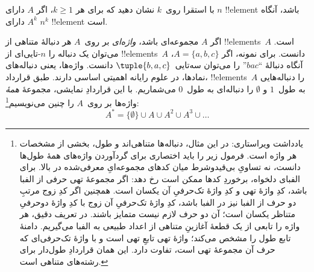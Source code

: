 \documentclass[../../../include/open-logic-section]{subfiles}
\begin{document}
\begin{prob}
با استقرا روی~$k$ نشان دهید که برای هر $k \ge 1$، اگر $A$ دارای
$n$ !!{element} باشد، آنگاه $A^k$ دارای $n^k$ !!{element} است.
\end{prob}

\begin{ex}
اگر $A$ مجموعه‌ای باشد، \emph{واژه‌ای} بر روی~$A$ هر دنبالهٔ متناهی از
!!{element}s~$A$ است. می‌توان یک دنباله را $n$-تایی‌ای از
!!{element}s~$A$ دانست. برای نمونه، اگر $A = \{a, b, c\}$، آنگاه
دنبالهٔ ``$bac$'' را می‌توان سه‌تایی~$\tuple{b, a, c}$ دانست.
واژه‌ها، یعنی دنباله‌های نمادها، در علوم رایانه اهمیتی اساسی دارند.
طبق قرارداد، !!{element}s~$A$ را دنباله‌هایی به طول~$1$ و
$\emptyset$ را دنباله‌ای به طول~$0$ می‌شماریم. با این قراردادِ نمایشی، مجموعهٔ
\emph{همهٔ} واژه‌ها بر روی~$A$ را چنین می‌نویسیم\footnote{یادداشت ویراستاری: در این مثال، دنباله‌ها متناهی‌اند و طول، بخشی از مشخصات هر واژه است. فرمول زیر را باید اختصاری برای گردآوردن واژه‌های همهٔ طول‌ها دانست، نه تساویِ بی‌قیدوشرط میان کدهای مجموعه‌ایِ معرفی‌شده در بالا. برای الفبای دلخواه، برخوردِ کدها ممکن است رخ دهد: اگر مجموعهٔ تهی حرفی از الفبا باشد، کدِ واژهٔ تهی و کدِ واژهٔ تک‌حرفیِ آن یکسان است. همچنین اگر کدِ زوج مرتبِ دو حرف از الفبا نیز در الفبا باشد، کدِ واژهٔ تک‌حرفیِ آن زوج با کدِ واژهٔ دوحرفیِ متناظر یکسان است؛ آن دو حرف لازم نیست متمایز باشند. در تعریف دقیق، هر واژه را تابعی از یک قطعهٔ آغازینِ متناهی از اعداد طبیعی به الفبا می‌گیریم. دامنهٔ تابع طول را مشخص می‌کند؛ واژهٔ تهی تابعِ تهی است و با واژهٔ تک‌حرفی‌ای که حرف آن مجموعهٔ تهی است، تفاوت دارد. این همان قراردادِ طول‌دار برای رشته‌های متناهی است.}:
\[
A^* = \{\emptyset\} \cup A \cup A^2 \cup A^3 \cup \dots
\]
\end{ex}
\end{document}
